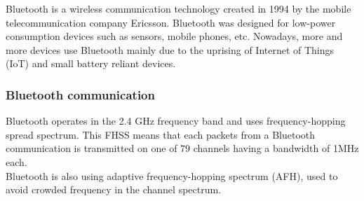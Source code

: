 Bluetooth is a wireless communication technology created in 1994 by the mobile telecommunication company Ericsson. Bluetooth was designed for low-power consumption devices such as sensors, mobile phones, etc. Nowadays, more and more devices use Bluetooth mainly due to the uprising of Internet of Things (IoT) and small battery reliant devices.

\subsubsection{Bluetooth communication}
Bluetooth operates in the 2.4 GHz frequency band and uses frequency-hopping spread spectrum. This FHSS means that each packets from a Bluetooth communication is transmitted on one of 79 channels having a bandwidth of 1MHz each.\\
Bluetooth is also using adaptive frequency-hopping spectrum (AFH), used to avoid crowded frequency in the channel spectrum.\\

